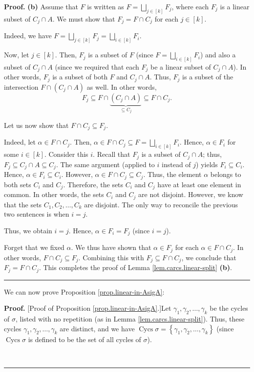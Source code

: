 \documentclass[numbers=enddot,12pt,final,onecolumn,notitlepage]{scrartcl}%
\numberwithin{exer}{section}
\theoremstyle{definition}
\newenvironment{proof}[1][Proof]{\noindent\textbf{#1.} }{\ \rule{0.5em}{0.5em}}
\let\sqcupnonlimits\bigsqcup
\renewcommand{\bigsqcup}{\sqcupnonlimits\limits}
\newenvironment{verlong}{}{}
\begin{document}
\begin{verlong}
\begin{proof}
\textbf{(b)} Assume that $F$ is written as $F=\bigsqcup_{j\in\left[  k\right]
}F_{j}$, where each $F_{j}$ is a linear subset of $C_{j}\cap A$. We must show
that $F_{j}=F\cap C_{j}$ for each $j\in\left[  k\right]  $.

Indeed, we have $F=\bigsqcup_{j\in\left[  k\right]  }F_{j}=\bigsqcup
_{i\in\left[  k\right]  }F_{i}$.

Now, let $j\in\left[  k\right]  $. Then, $F_{j}$ is a subset of $F$ (since
$F=\bigsqcup_{i\in\left[  k\right]  }F_{i}$) and also a subset of $C_{j}\cap
A$ (since we required that each $F_{j}$ be a linear subset of $C_{j}\cap A$).
In other words, $F_{j}$ is a subset of both $F$ and $C_{j}\cap A$. Thus,
$F_{j}$ is a subset of the intersection $F\cap\left(  C_{j}\cap A\right)  $ as
well. In other words,%
\[
F_{j}\subseteq F\cap\underbrace{\left(  C_{j}\cap A\right)  }_{\subseteq
C_{j}}\subseteq F\cap C_{j}.
\]


Let us now show that $F\cap C_{j}\subseteq F_{j}$.

Indeed, let $\alpha\in F\cap C_{j}$. Then, $\alpha\in F\cap C_{j}\subseteq
F=\bigsqcup_{i\in\left[  k\right]  }F_{i}$. Hence, $\alpha\in F_{i}$ for some
$i\in\left[  k\right]  $. Consider this $i$. Recall that $F_{j}$ is a subset
of $C_{j}\cap A$; thus, $F_{j}\subseteq C_{j}\cap A\subseteq C_{j}$. The same
argument (applied to $i$ instead of $j$) yields $F_{i}\subseteq C_{i}$. Hence,
$\alpha\in F_{i}\subseteq C_{i}$. However, $\alpha\in F\cap C_{j}\subseteq
C_{j}$. Thus, the element $\alpha$ belongs to both sets $C_{i}$ and $C_{j}$.
Therefore, the sets $C_{i}$ and $C_{j}$ have at least one element in common.
In other words, the sets $C_{i}$ and $C_{j}$ are not disjoint. However, we
know that the sets $C_{1},C_{2},\ldots,C_{k}$ are disjoint. The only way to
reconcile the previous two sentences is when $i=j$.

Thus, we obtain $i=j$. Hence, $\alpha\in F_{i}=F_{j}$ (since $i=j$).

Forget that we fixed $\alpha$. We thus have shown that $\alpha\in F_{j}$ for
each $\alpha\in F\cap C_{j}$. In other words, $F\cap C_{j}\subseteq F_{j}$.
Combining this with $F_{j}\subseteq F\cap C_{j}$, we conclude that
$F_{j}=F\cap C_{j}$. This completes the proof of Lemma
\ref{lem.carcs.linear-split} \textbf{(b)}.
\end{proof}

We can now prove Proposition \ref{prop.linear-in-AsigA}:

\begin{proof}
[Proof of Proposition \ref{prop.linear-in-AsigA}.]Let $\gamma_{1},\gamma
_{2},\ldots,\gamma_{k}$ be the cycles of $\sigma$, listed with no repetition
(as in Lemma \ref{lem.carcs.linear-split}). Thus, these cycles $\gamma
_{1},\gamma_{2},\ldots,\gamma_{k}$ are distinct, and we have
$\operatorname*{Cycs}\sigma=\left\{  \gamma_{1},\gamma_{2},\ldots,\gamma
_{k}\right\}  $ (since $\operatorname*{Cycs}\sigma$ is defined to be the set
of all cycles of $\sigma$).


\end{proof}
\end{verlong}
\end{document}
